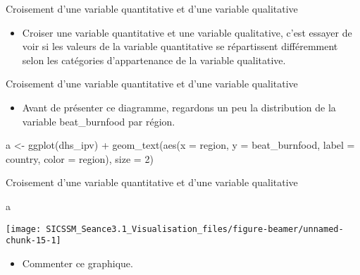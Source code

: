 \documentclass[
  ignorenonframetext,
]{beamer}
\newenvironment{Shaded}{\begin{snugshade}}{\end{snugshade}}
\newcommand{\AttributeTok}[1]{\textcolor[rgb]{0.77,0.63,0.00}{#1}}
\newcommand{\DecValTok}[1]{\textcolor[rgb]{0.00,0.00,0.81}{#1}}
\newcommand{\FunctionTok}[1]{\textcolor[rgb]{0.00,0.00,0.00}{#1}}
\newcommand{\NormalTok}[1]{#1}
\newcommand{\OtherTok}[1]{\textcolor[rgb]{0.56,0.35,0.01}{#1}}
\newcommand{\SpecialCharTok}[1]{\textcolor[rgb]{0.00,0.00,0.00}{#1}}
\providecommand{\tightlist}{%
  \setlength{\itemsep}{0pt}\setlength{\parskip}{0pt}}
\begin{document}
\begin{frame}{Croisement d'une variable quantitative et d'une variable
qualitative}
\protect\hypertarget{croisement-dune-variable-quantitative-et-dune-variable-qualitative}{}
\begin{itemize}
\tightlist
\item
  Croiser une variable quantitative et une variable qualitative, c'est
  essayer de voir si les valeurs de la variable quantitative se
  répartissent différemment selon les catégories d'appartenance de la
  variable qualitative.
\end{itemize}
\end{frame}

\begin{frame}[fragile]{Croisement d'une variable quantitative et d'une
variable qualitative}
\protect\hypertarget{croisement-dune-variable-quantitative-et-dune-variable-qualitative-1}{}
\begin{itemize}
\tightlist
\item
  Avant de présenter ce diagramme, regardons un peu la distribution de
  la variable beat\_burnfood par région.
\end{itemize}

\begin{Shaded}
\begin{Highlighting}[]
\NormalTok{a }\OtherTok{\textless{}{-}}
\FunctionTok{ggplot}\NormalTok{(dhs\_ipv) }\SpecialCharTok{+} 
  \FunctionTok{geom\_text}\NormalTok{(}\FunctionTok{aes}\NormalTok{(}\AttributeTok{x =}\NormalTok{ region, }\AttributeTok{y =}\NormalTok{ beat\_burnfood, }
                \AttributeTok{label =}\NormalTok{ country, }\AttributeTok{color =}\NormalTok{ region), }\AttributeTok{size =} \DecValTok{2}\NormalTok{)}
\end{Highlighting}
\end{Shaded}
\end{frame}

\begin{frame}[fragile]{Croisement d'une variable quantitative et d'une
variable qualitative}
\protect\hypertarget{croisement-dune-variable-quantitative-et-dune-variable-qualitative-2}{}
\begin{Shaded}
\begin{Highlighting}[]
\NormalTok{a }
\end{Highlighting}
\end{Shaded}

\begin{center}\texttt{[image: SICSSM\_Seance3.1\_Visualisation\_files/figure-beamer/unnamed-chunk-15-1]} \end{center}

\begin{itemize}
\tightlist
\item
  Commenter ce graphique.
\end{itemize}
\end{frame}
\end{document}
